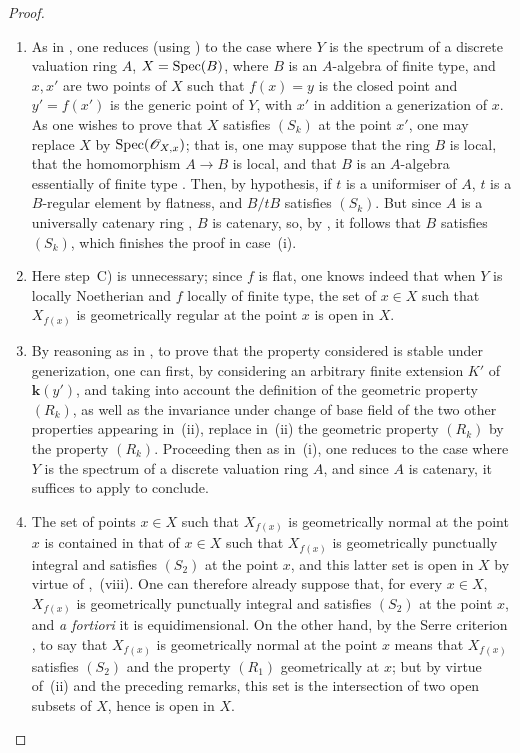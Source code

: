 \begin{proof}
\begin{enumerate}[label=(\roman*)]
  \item[(i)] As in , one reduces (using ) to the case where $Y$ is the spectrum of a discrete valuation ring $A$, $X=\operatorname{Spec}(B)$, where $B$ is an $A$-algebra of finite type, and $x,x'$ are two points of $X$ such that $f(x)=y$ is the closed point and $y'=f(x')$ is the generic point of $Y$, with $x'$ in addition a generization of $x$.
As one wishes to prove that $X$ satisfies $(S_k)$ at the point $x'$, one may replace $X$ by $\operatorname{Spec}(\mathscr{O}_{X,x})$; that is, one may suppose that the ring $B$ is local, that the homomorphism $A\to B$ is local, and that $B$ is an $A$-algebra essentially of finite type .
Then, by hypothesis, if $t$ is a uniformiser of $A$, $t$ is a $B$-regular element by flatness, and $B/tB$ satisfies $(S_k)$.
But since $A$ is a universally catenary ring , $B$ is catenary, so, by , it follows that $B$ satisfies $(S_k)$, which finishes the proof in case~(i).

  \item[(iii)] Here step~C) is unnecessary; since $f$ is flat, one knows indeed  that when $Y$ is locally Noetherian and $f$ locally of finite type, the set of $x\in X$ such that $X_{f(x)}$ is geometrically regular at the point $x$ is open in $X$.

  \item[(ii)] By reasoning as in , to prove that the property considered is stable under generization, one can first, by considering an arbitrary finite extension $K'$ of $\boldsymbol{k}(y')$, and taking into account the definition  of the geometric property $(R_k)$, as well as the invariance under change of base field of the two other properties appearing in~(ii), replace in~(ii) the geometric property $(R_k)$ by the property $(R_k)$.
Proceeding then as in~(i), one reduces to the case where $Y$ is the spectrum of a discrete valuation ring $A$, and since $A$ is catenary, it suffices to apply  to conclude.

  \item[(iv)] The set of points $x\in X$ such that $X_{f(x)}$ is geometrically normal at the point $x$ is contained in that of $x\in X$ such that $X_{f(x)}$ is geometrically punctually integral and satisfies $(S_2)$ at the point $x$, and this latter set is open in $X$ by virtue of ,~(viii).
One can therefore already suppose that, for every $x\in X$, $X_{f(x)}$ is geometrically punctually integral and satisfies $(S_2)$ at the point $x$, and \emph{a fortiori} it is equidimensional.
On the other hand, by the Serre criterion , to say that $X_{f(x)}$ is geometrically normal at the point $x$ means that $X_{f(x)}$ satisfies $(S_2)$ and the property $(R_1)$ geometrically at $x$;
but by virtue of~(ii) and the preceding remarks, this set is the intersection of two open subsets of $X$, hence is open in $X$.
\end{enumerate}
\end{proof}

